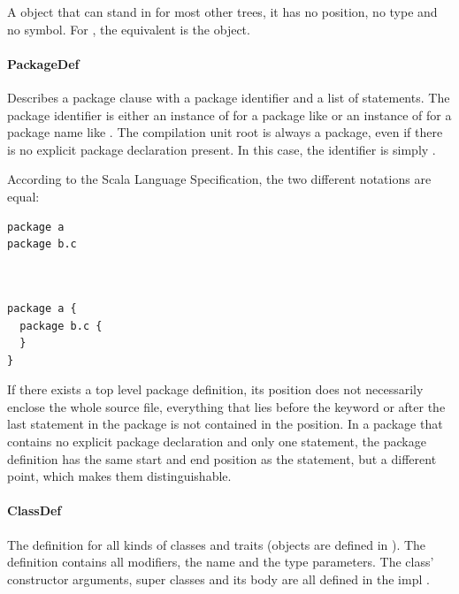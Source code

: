 \noindent A  object that can stand in for most other trees, it has no position, no type and no symbol. For , the equivalent is the  object.

\paragraph{PackageDef} 

\noindent Describes a package clause with a package identifier and a list of statements. The package identifier is either an instance of  for a package like  or an instance of  for a package name like . The compilation unit root is always a package, even if there is no explicit package declaration present. In this case, the identifier is simply . 

According to the Scala Language Specification, the two different notations are equal:

\begin{multicols}{2}
\begin{lstlisting}
package a
package b.c
  
  
\end{lstlisting}

\begin{lstlisting}
package a {
  package b.c {
  }
}
\end{lstlisting}
\end{multicols}

If there exists a top level package definition, its position does not necessarily enclose the whole source file, everything that lies before the  keyword or after the last statement in the package is not contained in the position. In a package that contains no explicit package declaration and only one statement, the package definition has the same start and end position as the statement, but a different point, which makes them distinguishable.

\paragraph{ClassDef} 

\noindent The definition for all kinds of classes and traits (objects are defined in ). The definition contains all modifiers, the name and the type parameters. The class' constructor arguments, super classes and its body are all defined in the impl .


